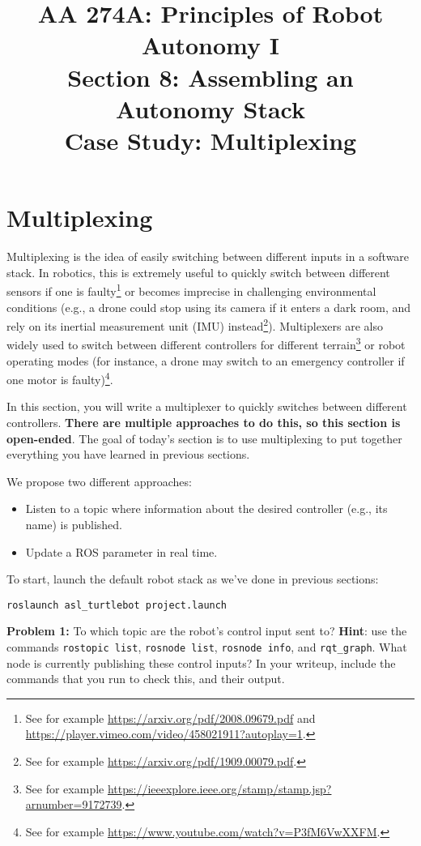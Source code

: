 \documentclass{article}
\title{AA 274A: Principles of Robot Autonomy I \\ Section 8: Assembling an Autonomy Stack\\
Case Study: Multiplexing}
\date{}
\begin{document}
\maketitle
\pagestyle{fancy}




\section{Multiplexing}
Multiplexing is the idea of easily switching between different inputs in a software stack. In robotics, this is extremely useful to quickly switch between different sensors if one is faulty\footnote{See for example \url{https://arxiv.org/pdf/2008.09679.pdf} and \url{https://player.vimeo.com/video/458021911?autoplay=1}.} or becomes imprecise in challenging environmental conditions (e.g., a drone could stop using its  camera if it enters a dark room, and rely on its inertial measurement unit (IMU) instead\footnote{See for example \url{https://arxiv.org/pdf/1909.00079.pdf}.}). Multiplexers are also widely used to switch between different controllers for different terrain\footnote{See for example \url{https://ieeexplore.ieee.org/stamp/stamp.jsp?arnumber=9172739}.} or robot operating modes (for instance, a drone may switch to an emergency controller if one motor is faulty)\footnote{See for example \url{https://www.youtube.com/watch?v=P3fM6VwXXFM}.}.

In this section, you will write a multiplexer to quickly switches between different controllers. \textbf{There are multiple approaches to do this, so this section is open-ended}. 
The goal of today's section is to use multiplexing to put together everything you have learned in previous sections.

We propose two different approaches:
\begin{itemize}
    \item Listen to a topic where information about the desired controller (e.g., its name) is published.
    \item Update a ROS parameter in real time.
\end{itemize}

To start, launch the default robot stack as we've done in previous sections:
\begin{lstlisting}
roslaunch asl_turtlebot project.launch
\end{lstlisting}

\textbf{Problem 1: } To which topic are the robot's control input sent to? \textbf{Hint}: use the commands \texttt{rostopic list}, \texttt{rosnode list}, \texttt{rosnode info}, and \texttt{rqt\_graph}. What node is currently publishing these control inputs? In your writeup, include the commands that you run to check this, and their output.
\end{document}
